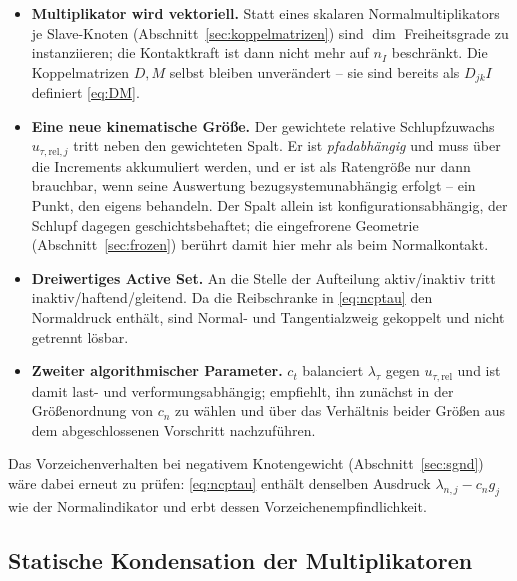 \documentclass[a4paper,11pt]{article}
\def\bm#1{#1}%
\def\tilde#1{#1}%
\begin{document}
\begin{itemize}\itemsep2pt
  \item \textbf{Multiplikator wird vektoriell.} Statt eines skalaren Normalmultiplikators je
        Slave-Knoten (Abschnitt~\ref{sec:koppelmatrizen}) sind $\dim$ Freiheitsgrade zu
        instanziieren; die Kontaktkraft ist dann nicht mehr auf $\bm n_I$ beschränkt. Die
        Koppelmatrizen $\bm D,\bm M$ selbst bleiben unverändert -- sie sind bereits als
        $D_{jk}\bm I$ definiert \eqref{eq:DM}.
  \item \textbf{Eine neue kinematische Größe.} Der gewichtete relative Schlupfzuwachs
        $\tilde{\bm u}_{\tau,\text{rel},j}$ tritt neben den gewichteten Spalt. Er ist
        \emph{pfadabhängig} und muss über die Increments akkumuliert werden, und er ist als
        Ratengröße nur dann brauchbar, wenn seine Auswertung bezugsystemunabhängig erfolgt
        -- ein Punkt, den \citet{gitterle} eigens behandeln. Der Spalt allein ist
        konfigurationsabhängig, der Schlupf dagegen geschichtsbehaftet; die eingefrorene
        Geometrie (Abschnitt~\ref{sec:frozen}) berührt damit hier mehr als beim Normalkontakt.
  \item \textbf{Dreiwertiges Active Set.} An die Stelle der Aufteilung aktiv/inaktiv tritt
        inaktiv/haftend/gleitend. Da die Reibschranke in \eqref{eq:ncptau} den Normaldruck
        enthält, sind Normal- und Tangentialzweig gekoppelt und nicht getrennt lösbar.
  \item \textbf{Zweiter algorithmischer Parameter.} $c_t$ balanciert $\bm\lambda_\tau$ gegen
        $\tilde{\bm u}_{\tau,\text{rel}}$ und ist damit last- und verformungsabhängig;
        \citet[Abschn.~3.5.2]{farah} empfiehlt, ihn zunächst in der Größenordnung von $c_n$ zu
        wählen und über das Verhältnis beider Größen aus dem abgeschlossenen Vorschritt
        nachzuführen.
\end{itemize}

\noindent Das Vorzeichenverhalten bei negativem Knotengewicht (Abschnitt~\ref{sec:sgnd}) wäre
dabei erneut zu prüfen: \eqref{eq:ncptau} enthält denselben Ausdruck
$\lambda_{n,j}-c_n\tilde g_j$ wie der Normalindikator und erbt dessen Vorzeichenempfindlichkeit.

\subsection{Statische Kondensation der Multiplikatoren}
\label{sec:ausblick:kondensation}
\end{document}
